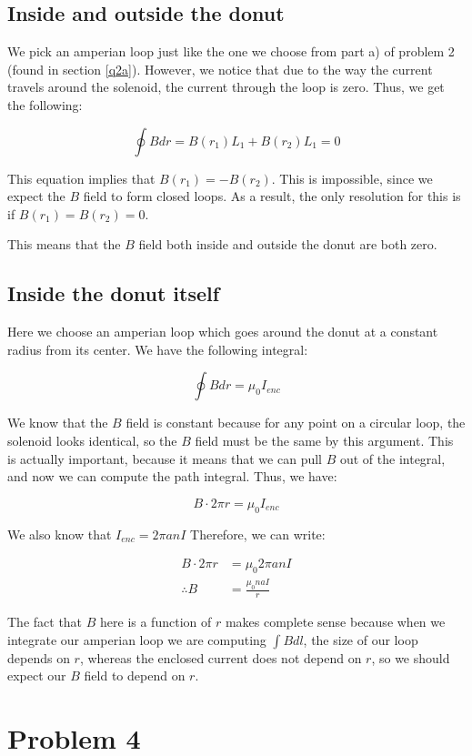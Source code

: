 \documentclass{article}
\theoremstyle{definition}
\numberwithin{equation}{section}
\numberwithin{definition}{section}
\begin{document}
\subsection*{Inside and outside the donut}

We pick an amperian loop just like the one we choose from part a) of problem 2 (found in section \ref{q2a}). However, we notice that due to the way the current travels around the solenoid, the current through the loop is zero. Thus, we get the following:

\[ \oint B dr = B(r_1) L_1 + B(r_2)L_1 = 0\]

This equation implies that $B(r_1) = - B(r_2)$. This is impossible, since we expect the $B$ field to form closed loops. As a result, the only resolution for this is if $B(r_1) = B(r_2) = 0$.

This means that the $B$ field both inside and outside the donut are both zero.

\subsection*{Inside the donut itself}

Here we choose an amperian loop which goes around the donut at a constant radius from its center. We have the following integral:

\[ \oint B dr = \mu_0 I_{enc}\]

We know that the $B$ field is constant because for any point on a circular loop, the solenoid looks identical, so the $B$ field must be the same by this argument. This is actually important, because it means that we can pull $B$ out of the integral, and now we can compute the path integral. Thus, we have:

\[B \cdot 2\pi r = \mu_0I_{enc}\]

We also know that $I_{enc} = 2\pi anI$ Therefore, we can write:

\begin{align*}
  B \cdot 2\pi r &= \mu_0 2\pi an I \\
  \therefore B &= \frac{\mu_0 naI}{r}
\end{align*}

The fact that $B$ here is a function of $r$ makes complete sense because when we integrate our amperian loop we are computing $\int B dl$, the size of our loop depends on $r$, whereas the enclosed current does not depend on $r$, so we should expect our $B$ field to depend on $r$.

\section{Problem 4}
\end{document}
